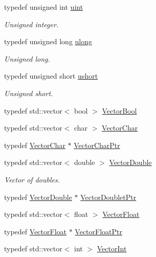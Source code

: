 \begin{DoxyCompactItemize}
typedef unsigned int \hyperlink{namespace_k_k_b_ab8557ae1b1f2361659d82a890e2f8014}{uint}
\begin{DoxyCompactList}\small\item\em Unsigned integer. \end{DoxyCompactList}\item 
typedef unsigned long \hyperlink{namespace_k_k_b_ad16da29960588b11a873b8b16b197396}{ulong}
\begin{DoxyCompactList}\small\item\em Unsigned long. \end{DoxyCompactList}\item 
typedef unsigned short \hyperlink{namespace_k_k_b_a4a7e2d1bab49f38edf25c38a8dc20012}{ushort}
\begin{DoxyCompactList}\small\item\em Unsigned short. \end{DoxyCompactList}\item 
typedef std\+::vector$<$ bool $>$ \hyperlink{namespace_k_k_b_a14c7fc0d2e2c8b80878017f195980b89}{Vector\+Bool}
\item 
typedef std\+::vector$<$ char $>$ \hyperlink{namespace_k_k_b_ac5763efba6ccdbee14392d153dd69809}{Vector\+Char}
\item 
typedef \hyperlink{namespace_k_k_b_ac5763efba6ccdbee14392d153dd69809}{Vector\+Char} $\ast$ \hyperlink{namespace_k_k_b_acdcd703f4c3f54b8a4aa38cdc95af701}{Vector\+Char\+Ptr}
\item 
typedef std\+::vector$<$ double $>$ \hyperlink{namespace_k_k_b_a5906c207479607e5f450434095914a41}{Vector\+Double}
\begin{DoxyCompactList}\small\item\em Vector of doubles. \end{DoxyCompactList}\item 
typedef \hyperlink{namespace_k_k_b_a5906c207479607e5f450434095914a41}{Vector\+Double} $\ast$ \hyperlink{namespace_k_k_b_a035c6931de674cc639eaebeca6419ad8}{Vector\+Doublet\+Ptr}
\item 
typedef std\+::vector$<$ float $>$ \hyperlink{namespace_k_k_b_a4820c3670ee1fe74f0c4de981c600faf}{Vector\+Float}
\item 
typedef \hyperlink{namespace_k_k_b_a4820c3670ee1fe74f0c4de981c600faf}{Vector\+Float} $\ast$ \hyperlink{namespace_k_k_b_a182835040a03db3c21a7ea4e46c84790}{Vector\+Float\+Ptr}
\item 
typedef std\+::vector$<$ int $>$ \hyperlink{namespace_k_k_b_a791ebe73f89917067a7aab9dbd817e45}{Vector\+Int}

\end{DoxyCompactItemize}
